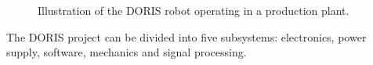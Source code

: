 \documentclass{ifacconf}
\begin{document}
\begin{figure}[ht]
\centering
{}
\vspace{-.1cm}
\caption{Illustration of the DORIS robot operating in a production plant.}\vspace{-0.25cm}
\label{fig:DORIS-overview}
\end{figure}

The DORIS project can be divided into five subsystems: electronics, power
supply, software, mechanics and signal processing.


\end{document}
